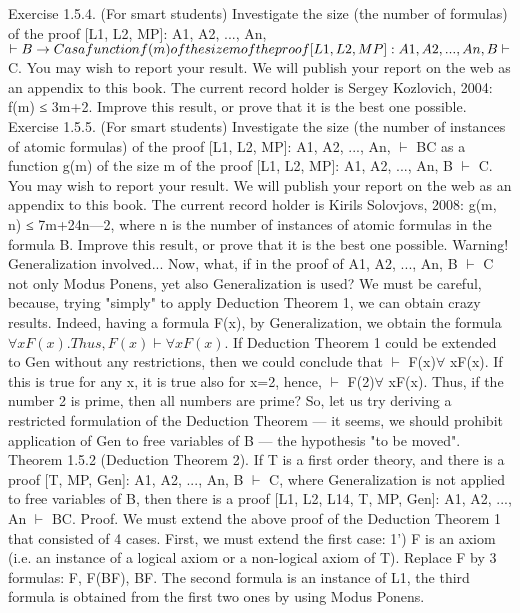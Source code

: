 Exercise 1.5.4. (For smart students) Investigate the size (the number of formulas) of the proof [L1, L2,
MP]: A1, A2, ..., An, \(\vdash B\rightarrow C as a function f(m) of the size m of the proof [L1, L2, MP]: A1, A2, ..., An, B \vdash\)
C. You may wish to report your result. We will publish your report on the web as an appendix to this
book. The current record holder is Sergey Kozlovich, 2004: f(m) ≤ 3m+2. Improve this result, or prove
that it is the best one possible.
Exercise 1.5.5. (For smart students) Investigate the size (the number of instances of atomic formulas) of
the proof [L1, L2, MP]: A1, A2, ..., An, \(\vdash\) B\IMPLIES C as a function g(m) of the size m of the proof [L1, L2, MP]:
A1, A2, ..., An, B \(\vdash\) C. You may wish to report your result. We will publish your report on the web as an
appendix to this book. The current record holder is Kirils Solovjovs, 2008: g(m, n) ≤ 7m+24n---2, where n
is the number of instances of atomic formulas in the formula B. Improve this result, or prove that it is the
best one possible.
Warning! Generalization involved...
Now, what, if in the proof of A1, A2, ..., An, B \(\vdash\) C not only Modus Ponens, yet also Generalization is
used?
We must be careful, because, trying "simply" to apply Deduction Theorem 1, we can obtain crazy results.
Indeed, having a formula F(x), by Generalization, we obtain the formula \(\forall xF(x). Thus, F(x) \vdash \forall xF(x)\). If
Deduction Theorem 1 could be extended to Gen without any restrictions, then we could conclude that \(\vdash\)
F(x)\IMPLIES \(\forall\) xF(x). If this is true for any x, it is true also for x=2, hence, \(\vdash\) F(2)\IMPLIES \(\forall\) xF(x). Thus, if the number
2 is prime, then all numbers are prime?
So, let us try deriving a restricted formulation of the Deduction Theorem --- it seems, we should prohibit
application of Gen to free variables of B --- the hypothesis "to be moved".
Theorem 1.5.2 (Deduction Theorem 2). If T is a first order theory, and there is a proof [T, MP, Gen]: A1,
A2, ..., An, B \(\vdash\) C, where Generalization is not applied to free variables of B, then there is a proof [L1, L2,
L14, T, MP, Gen]: A1, A2, ..., An \(\vdash\) B\IMPLIES C.
Proof. We must extend the above proof of the Deduction Theorem 1 that consisted of 4 cases. First, we
must extend the first case:
1') F is an axiom (i.e. an instance of a logical axiom or a non-logical axiom of T). Replace F by 3
formulas: F, F\IMPLIES (B\IMPLIES F), B\IMPLIES F. The second formula is an instance of L1, the third formula is obtained
from the first two ones by using Modus Ponens.
